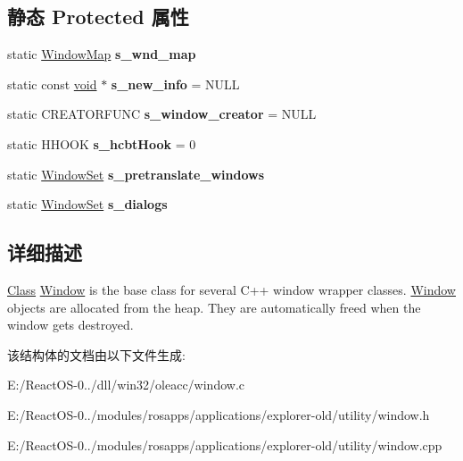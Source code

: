 \subsection*{静态 Protected 属性}
\begin{DoxyCompactItemize}
\item 
\mbox{\label{struct_window_ab7f843553c787065c13a8c2d34789213}} 
static \hyperlink{classmap}{Window\+Map} {\bfseries s\+\_\+wnd\+\_\+map}
\item 
\mbox{\label{struct_window_a64da123399f06fc6a7d74efc66b2ee3c}} 
static const \hyperlink{interfacevoid}{void} $\ast$ {\bfseries s\+\_\+new\+\_\+info} = N\+U\+LL
\item 
\mbox{\label{struct_window_a377ecec8892f7dc04fedd41e39da0dc9}} 
static C\+R\+E\+A\+T\+O\+R\+F\+U\+NC {\bfseries s\+\_\+window\+\_\+creator} = N\+U\+LL
\item 
\mbox{\label{struct_window_a0a05afdf3fce9f388526d941c9eb9eb5}} 
static H\+H\+O\+OK {\bfseries s\+\_\+hcbt\+Hook} = 0
\item 
\mbox{\label{struct_window_ae984d672567b31d03b979e3cdbd21c6b}} 
static \hyperlink{classset}{Window\+Set} {\bfseries s\+\_\+pretranslate\+\_\+windows}
\item 
\mbox{\label{struct_window_acbbe247443fc19569ced3870d161d675}} 
static \hyperlink{classset}{Window\+Set} {\bfseries s\+\_\+dialogs}
\end{DoxyCompactItemize}


\subsection{详细描述}
\hyperlink{class_class}{Class} \hyperlink{struct_window}{Window} is the base class for several C++ window wrapper classes. \hyperlink{struct_window}{Window} objects are allocated from the heap. They are automatically freed when the window gets destroyed. 

该结构体的文档由以下文件生成\+:\begin{DoxyCompactItemize}
\item 
E\+:/\+React\+O\+S-\/0../dll/win32/oleacc/window.\+c\item 
E\+:/\+React\+O\+S-\/0../modules/rosapps/applications/explorer-\/old/utility/window.\+h\item 
E\+:/\+React\+O\+S-\/0../modules/rosapps/applications/explorer-\/old/utility/window.\+cpp\end{DoxyCompactItemize}
